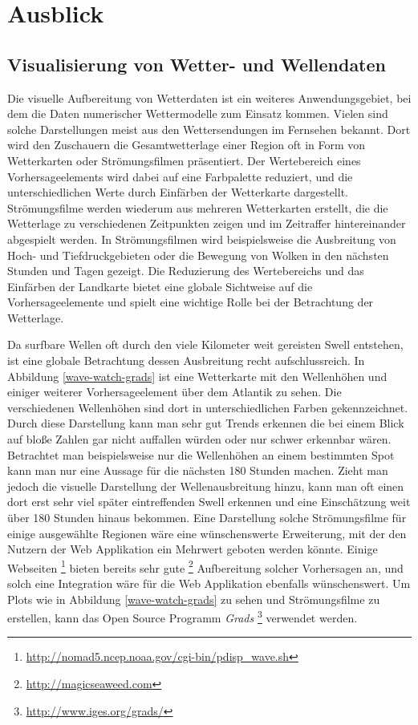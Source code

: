 \chapter{Ausblick}

\section{Visualisierung von Wetter- und Wellendaten}
Die visuelle Aufbereitung von Wetterdaten ist ein weiteres
Anwendungsgebiet, bei dem die Daten numerischer Wettermodelle zum
Einsatz kommen. Vielen sind solche Darstellungen meist aus den
Wettersendungen im Fernsehen bekannt. Dort wird den Zuschauern die
Gesamtwetterlage einer Region oft in Form von Wetterkarten oder
Strömungsfilmen präsentiert. Der Wertebereich eines Vorhersageelements
wird dabei auf eine Farbpalette reduziert, und die unterschiedlichen
Werte durch Einfärben der Wetterkarte dargestellt. Strömungsfilme
werden wiederum aus mehreren Wetterkarten erstellt, die die Wetterlage
zu verschiedenen Zeitpunkten zeigen und im Zeitraffer hintereinander
abgespielt werden. In Strömungsfilmen wird beispielsweise die
Ausbreitung von Hoch- und Tiefdruckgebieten oder die Bewegung von
Wolken in den nächsten Stunden und Tagen gezeigt. Die Reduzierung des
Wertebereichs und das Einfärben der Landkarte bietet eine globale
Sichtweise auf die Vorhersageelemente und spielt eine wichtige Rolle
bei der Betrachtung der Wetterlage.

Da surfbare Wellen oft durch den viele Kilometer weit gereisten Swell
entstehen, ist eine globale Betrachtung dessen Ausbreitung recht
aufschlussreich. In Abbildung \ref{wave-watch-grads} ist eine
Wetterkarte mit den Wellenhöhen und einiger weiterer Vorhersageelement
über dem Atlantik zu sehen. Die verschiedenen Wellenhöhen sind dort in
unterschiedlichen Farben gekennzeichnet. Durch diese Darstellung kann
man sehr gut Trends erkennen die bei einem Blick auf bloße Zahlen gar
nicht auffallen würden oder nur schwer erkennbar wären. Betrachtet man
beispielsweise nur die Wellenhöhen an einem bestimmten Spot kann man
nur eine Aussage für die nächsten 180 Stunden machen. Zieht man jedoch
die visuelle Darstellung der Wellenausbreitung hinzu, kann man oft
einen dort erst sehr viel später eintreffenden Swell erkennen und eine
Einschätzung weit über 180 Stunden hinaus bekommen. Eine Darstellung
solche Strömungsfilme für einige ausgewählte Regionen wäre eine
wünschenswerte Erweiterung, mit der den Nutzern der Web Applikation
ein Mehrwert geboten werden könnte. Einige Webseiten
\footnote{\url{http://nomad5.ncep.noaa.gov/cgi-bin/pdisp_wave.sh}}
bieten bereits sehr gute \footnote{\url{http://magicseaweed.com}}
Aufbereitung solcher Vorhersagen an, und solch eine Integration wäre
für die Web Applikation ebenfalls wünschenswert. Um Plots wie in
Abbildung \ref{wave-watch-grads} zu sehen und Strömungsfilme zu
erstellen, kann das Open Source Programm \textit{Grads}
\footnote{\url{http://www.iges.org/grads/}} verwendet werden.

